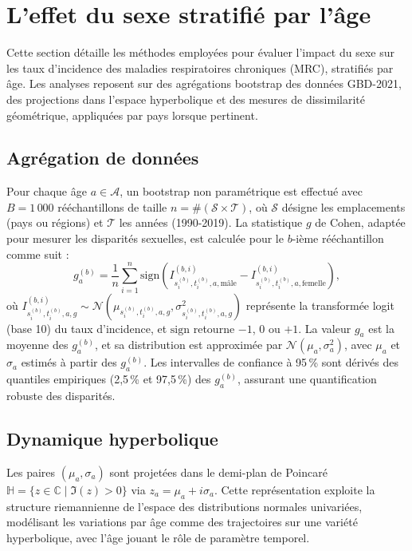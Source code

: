 \section{L'effet du sexe stratifié par l'âge}

Cette section détaille les méthodes employées pour évaluer l'impact du sexe sur les taux d'incidence des maladies respiratoires chroniques (MRC), stratifiés par âge. Les analyses reposent sur des agrégations bootstrap des données GBD-2021, des projections dans l'espace hyperbolique et des mesures de dissimilarité géométrique, appliquées par pays lorsque pertinent.

\subsection{Agrégation de données}

Pour chaque âge $a \in \mathcal{A}$, un bootstrap non paramétrique est effectué avec $B = 1\,000$ rééchantillons de taille $n = \#(\mathcal{S} \times \mathcal{T})$, où $\mathcal{S}$ désigne les emplacements (pays ou régions) et $\mathcal{T}$ les années (1990-2019). La statistique $g$ de Cohen, adaptée pour mesurer les disparités sexuelles, est calculée pour le $b$-ième rééchantillon comme suit :
 \begin{equation}
g_a^{(b)} = \frac{1}{n} \sum_{i=1}^n \mathrm{sign} \left( I_{s_i^{(b)}, t_i^{(b)}, a, \mathrm{mâle}}^{(b,i)} - I_{s_i^{(b)}, t_i^{(b)}, a, \mathrm{femelle}}^{(b,i)} \right),
 \end{equation}
où $I_{s_i^{(b)}, t_i^{(b)}, a, g}^{(b,i)} \sim \mathcal{N}(\mu_{s_i^{(b)}, t_i^{(b)}, a, g}, \sigma_{s_i^{(b)}, t_i^{(b)}, a, g}^2)$ représente la transformée logit (base 10) du taux d'incidence, et $\mathrm{sign}$ retourne $-1$, $0$ ou $+1$. La valeur $g_a$ est la moyenne des $g_a^{(b)}$, et sa distribution est approximée par $\mathcal{N}(\mu_a, \sigma_a^2)$, avec $\mu_a$ et $\sigma_a$ estimés à partir des $g_a^{(b)}$. Les intervalles de confiance à 95\,\% sont dérivés des quantiles empiriques (2,5\,\% et 97,5\,\%) des $g_a^{(b)}$, assurant une quantification robuste des disparités.

\subsection{Dynamique hyperbolique}

Les paires $(\mu_a, \sigma_a)$ sont projetées dans le demi-plan de Poincaré $\mathbb{H} = \{ z \in \mathbb{C} \mid \Im(z) > 0 \}$ via $z_a = \mu_a + i \sigma_a$. Cette représentation exploite la structure riemannienne de l'espace des distributions normales univariées, modélisant les variations par âge comme des trajectoires sur une variété hyperbolique, avec l'âge jouant le rôle de paramètre temporel.

